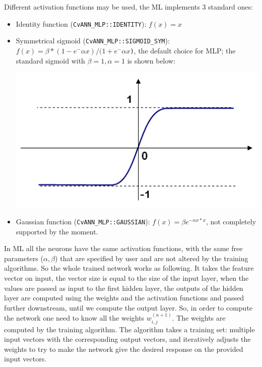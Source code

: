 Different activation functions may be used, the ML implements 3 standard ones:
\begin{itemize}
\item{Identity function (\texttt{CvANN\_MLP::IDENTITY}): \texttt{$f(x)=x$}}
\item{Symmetrical sigmoid (\texttt{CvANN\_MLP::SIGMOID\_SYM}): \texttt{$f(x)=\beta*(1-e^-\alpha x)/(1+e^-\alpha x$)}, the default choice for MLP; the standard sigmoid with $\beta =1, \alpha =1$ is shown below:}

\includegraphics{pics/sigmoid_bipolar.png} 

\item{Gaussian function (\texttt{CvANN\_MLP::GAUSSIAN}): \texttt{$f(x)=\beta e^{-\alpha x*x}$}, not completely supported by the moment.}
\end{itemize}
In ML all the neurons have the same activation functions, with the same free parameters ($\alpha, \beta$) that are specified by user and are not altered by the training algorithms.
\newline
\newline
So the whole trained network works as following. It takes the feature vector on input, the vector size is equal to the size of the input layer, when the values are passed as input to the first hidden layer, the outputs of the hidden layer are computed using the weights and the activation functions and passed further downstream, until we compute the output layer.
\newline
\newline
So, in order to compute the network one need to know all the weights \texttt{$w^(n+1)_{i,j}$}. The weights are computed by the training algorithm. The algorithm takes a training set: multiple input vectors with the corresponding output vectors, and iteratively adjusts the weights to try to make the network give the desired response on the provided input vectors.
